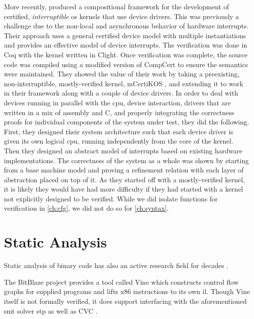 More recently, \textcite{chen2018compositional} produced a compositional framework
for the development of certified, \emph{interruptible}%
\ac{os} kernels that use device drivers.%
This was previously a challenge due to the non-local and asynchronous behavior
of hardware interrupts. Their approach uses a general certified device model
with multiple instantiations and provides an effective model of device interrupts.
The verification was done in Coq with the kernel written in Clight.
Once verification was complete, the source code was compiled using a modified version
of CompCert to ensure the semantics were maintained.
They showed the value of their work by taking a preexisting,
non-interruptible, mostly-verified kernel, mCertiKOS \autocite{costanzo2016endtoend},
and extending it to work in their framework along with a couple of device drivers.
In order to deal with devices running in parallel with the \ac{cpu},
device interaction, drivers that are written in a mix of assembly and C,
and properly integrating the correctness proofs for individual components
of the system under test, they did the following.
First, they designed their system architecture such that each device driver
is given its own logical \ac{cpu}, running independently from the core of the kernel.
Then they designed an abstract model of interrupts
based on existing hardware implementations.
The correctness of the system as a whole was shown
by starting from a base machine model
and proving a refinement relation with each layer of abstraction placed on top of it.
As they started off with a mostly-verified kernel, it is likely they would have had
more difficulty if they had started with a kernel
not explicitly designed to be verified. While we did isolate functions
for verification in \cref{ch:cfg}, we did not do so for \cref{ch:syntax}.

\section{Static Analysis}\label{se:static_analysis}
Static analysis of binary code has also an active research field
for decades  \autocite{kruegel2005automating,brumley2011bap,wang2017angr}.

The BitBlaze project  \autocite{song2008bitblaze,BitBlazeWebSite}
provides a tool called Vine which constructs control flow graphs
for supplied programs and lifts x86 instructions to its own \ac{il}.
Though Vine itself is not formally verified,
it does support interfacing with the aforementioned \ac{smt} solver \ac{stp}
as well as CVC \autocite{barrett2004cvcl,barrett2007cvc3}.

